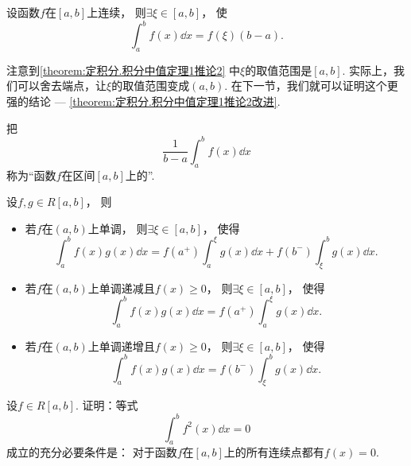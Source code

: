 \begin{corollary}\label{theorem:定积分.积分中值定理1推论2}
设函数\(f\)在\([a,b]\)上连续，
则\(\exists\xi\in[a,b]\)，
使\begin{equation}
	\int_a^b f(x) \dd{x} = f(\xi) (b-a).
\end{equation}
\end{corollary}
\begin{remark}
注意到\cref{theorem:定积分.积分中值定理1推论2} 中\(\xi\)的取值范围是\([a,b]\).
实际上，我们可以舍去端点，让\(\xi\)的取值范围变成\((a,b)\).
在下一节，我们就可以证明这个更强的结论 --- \cref{theorem:定积分.积分中值定理1推论2改进}.
\end{remark}
\begin{definition}
把\begin{equation}
	\frac{1}{b-a} \int_a^b f(x) \dd{x}
\end{equation}
称为“函数\(f\)在区间\([a,b]\)上的”.
\end{definition}

\begin{theorem}[积分第二中值定理]\label{theorem:定积分.积分中值定理2}
设\(f,g \in R[a,b]\)，
则\begin{itemize}
	\item 若\(f\)在\((a,b)\)上单调，
	则\(\exists \xi \in [a,b]\)，
	使得\[
		\int_a^b f(x) g(x) \dd{x}
		= f(a^+) \int_a^{\xi} g(x) \dd{x} + f(b^-) \int_{\xi}^b g(x) \dd{x}.
	\]
	\item 若\(f\)在\((a,b)\)上单调递减且\(f(x) \geq 0\)，
	则\(\exists \xi \in [a,b]\)，
	使得\[
		\int_a^b f(x) g(x) \dd{x}
		= f(a^+) \int_a^{\xi} g(x) \dd{x}.
	\]
	\item 若\(f\)在\((a,b)\)上单调递增且\(f(x) \geq 0\)，
	则\(\exists \xi \in [a,b]\)，
	使得\[
		\int_a^b f(x) g(x) \dd{x}
		= f(b^-) \int_{\xi}^b g(x) \dd{x}.
	\]
\end{itemize}
\end{theorem}

\begin{example}
设\(f \in R[a,b]\).
证明：等式\[
	\int_a^b f^2(x) \dd{x} = 0
\]成立的充分必要条件是：
对于函数\(f\)在\([a,b]\)上的所有连续点都有\(f(x)=0\).
\end{example}
